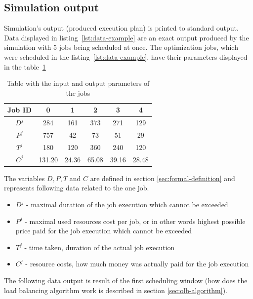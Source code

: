 \subsection{Simulation output}\label{subsec:simulation-output}

Simulation's output (produced execution plan) is printed to standard output.
Data displayed in listing~\ref{lst:data-example} are an exact output produced by the simulation with 5 jobs being scheduled at once.
The optimization jobs,
which were scheduled in the listing~\ref{lst:data-example},
have their parameters displayed in the table~\ref{table:jobs-parameters}

\begin{table}[ht]
	\centering
	\caption{Table with the input and output parameters of the jobs}
	\begin{tabular}{|c|c c c c c|} 
		\hline
		Job ID   & 0      & 1     & 2     & 3     & 4     \\
		\hline\hline
		$D^{j}$  & 284    & 161   & 373   & 271   & 129   \\
		\hline
		$P^{j}$  & 757    & 42    & 73    & 51    & 29    \\
		\hline
		$T^{j}$ & 180    & 120   & 360   & 240   & 120   \\
		\hline
    $C^{j}$     & 131.20 & 24.36 & 65.08 & 39.16 & 28.48 \\
    \hline
	\end{tabular}
	\label{table:jobs-parameters}
\end{table}

The variables $D,P,T$ and $C$ are defined in section \ref{sec:formal-definition}
and represents following data related to the one job.
\begin{itemize}
  \item $D^{j}$ - maximal duration of the job execution which cannot be exceeded
  \item $P^{j}$ - maximal used resources cost per job,
  or in other words highest possible price paid for the job execution which cannot be exceeded
	\item $T^{j}$ - time taken, duration of the actual job execution
	\item $C^{j}$ - resource costs, how much money was actually paid for the job execution
\end{itemize}

The following data output is result of the first scheduling window 
(how does the load balancing algorithm work is described in section \ref{sec:olb-algorithm}).

